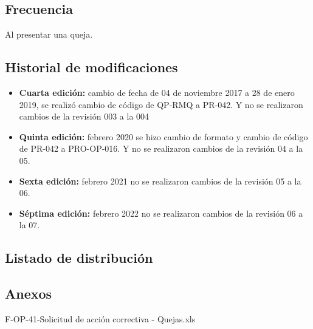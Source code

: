 \subsection{Frecuencia}

Al presentar una queja.

\subsection{Historial de modificaciones}

\begin{itemize}
	\item \textbf{Cuarta edición:} cambio de fecha de 04 de noviembre 2017 a 28 de enero 2019, se realizó cambio de código de QP-RMQ a PR-042. Y no se realizaron cambios de la revisión 003 a la 004
	\item \textbf{Quinta edición:} febrero 2020 se hizo cambio de formato y cambio de código de PR-042 a PRO-OP-016. Y no se realizaron cambios de la revisión 04 a la 05.
	\item \textbf{Sexta edición:} febrero 2021 no se realizaron cambios de la revisión 05 a la 06.
	\item \textbf{Séptima edición:} febrero 2022 no se realizaron cambios de la revisión 06 a la 07.
\end{itemize}

\subsection{Listado de distribución}


\subsection{Anexos}

F-OP-41-Solicitud de acción correctiva - Quejas.xls
